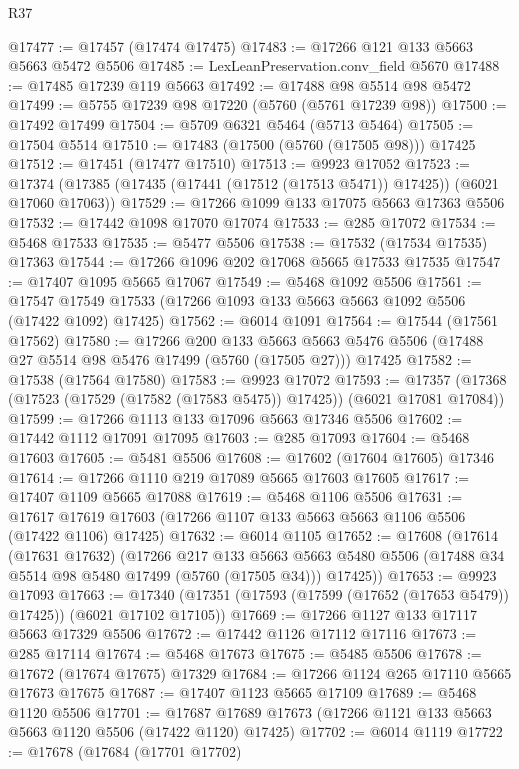 \begin{lexlean}{R37}
\begin{coremodule}
@17477 := @17457 (@17474 @17475)
@17483 := @17266 @121 @133 @5663 @5663 @5472 @5506
@17485 := LexLeanPreservation.conv_field @5670
@17488 := @17485 @17239 @119 @5663
@17492 := @17488 @98 @5514 @98 @5472
@17499 := @5755 @17239 @98 @17220 (@5760 (@5761 @17239 @98))
@17500 := @17492 @17499
@17504 := @5709 @6321 @5464 (@5713 @5464)
@17505 := @17504 @5514
@17510 := @17483 (@17500 (@5760 (@17505 @98))) @17425
@17512 := @17451 (@17477 @17510)
@17513 := @9923 @17052
@17523 := @17374 (@17385 (@17435 (@17441 (@17512 (@17513 @5471)) @17425)) (@6021 @17060 @17063))
@17529 := @17266 @1099 @133 @17075 @5663 @17363 @5506
@17532 := @17442 @1098 @17070 @17074
@17533 := @285 @17072
@17534 := @5468 @17533
@17535 := @5477 @5506
@17538 := @17532 (@17534 @17535) @17363
@17544 := @17266 @1096 @202 @17068 @5665 @17533 @17535
@17547 := @17407 @1095 @5665 @17067
@17549 := @5468 @1092 @5506
@17561 := @17547 @17549 @17533 (@17266 @1093 @133 @5663 @5663 @1092 @5506 (@17422 @1092) @17425)
@17562 := @6014 @1091
@17564 := @17544 (@17561 @17562)
@17580 := @17266
    @200
    @133
    @5663
    @5663
    @5476
    @5506
    (@17488 @27 @5514 @98 @5476 @17499 (@5760 (@17505 @27)))
    @17425
@17582 := @17538 (@17564 @17580)
@17583 := @9923 @17072
@17593 := @17357 (@17368 (@17523 (@17529 (@17582 (@17583 @5475)) @17425)) (@6021 @17081 @17084))
@17599 := @17266 @1113 @133 @17096 @5663 @17346 @5506
@17602 := @17442 @1112 @17091 @17095
@17603 := @285 @17093
@17604 := @5468 @17603
@17605 := @5481 @5506
@17608 := @17602 (@17604 @17605) @17346
@17614 := @17266 @1110 @219 @17089 @5665 @17603 @17605
@17617 := @17407 @1109 @5665 @17088
@17619 := @5468 @1106 @5506
@17631 := @17617 @17619 @17603 (@17266 @1107 @133 @5663 @5663 @1106 @5506 (@17422 @1106) @17425)
@17632 := @6014 @1105
@17652 := @17608
    (@17614
      (@17631 @17632)
      (@17266
        @217
        @133
        @5663
        @5663
        @5480
        @5506
        (@17488 @34 @5514 @98 @5480 @17499 (@5760 (@17505 @34)))
        @17425))
@17653 := @9923 @17093
@17663 := @17340 (@17351 (@17593 (@17599 (@17652 (@17653 @5479)) @17425)) (@6021 @17102 @17105))
@17669 := @17266 @1127 @133 @17117 @5663 @17329 @5506
@17672 := @17442 @1126 @17112 @17116
@17673 := @285 @17114
@17674 := @5468 @17673
@17675 := @5485 @5506
@17678 := @17672 (@17674 @17675) @17329
@17684 := @17266 @1124 @265 @17110 @5665 @17673 @17675
@17687 := @17407 @1123 @5665 @17109
@17689 := @5468 @1120 @5506
@17701 := @17687 @17689 @17673 (@17266 @1121 @133 @5663 @5663 @1120 @5506 (@17422 @1120) @17425)
@17702 := @6014 @1119
@17722 := @17678
    (@17684
      (@17701 @17702)

\end{coremodule}
\end{lexlean}
